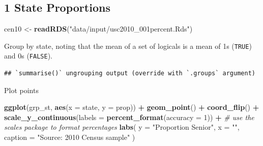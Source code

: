 \documentclass[]{book}
\newenvironment{Shaded}{\begin{snugshade}}{\end{snugshade}}
\newcommand{\CommentTok}[1]{\textcolor[rgb]{0.56,0.35,0.01}{\textit{#1}}}
\newcommand{\DataTypeTok}[1]{\textcolor[rgb]{0.13,0.29,0.53}{#1}}
\newcommand{\DecValTok}[1]{\textcolor[rgb]{0.00,0.00,0.81}{#1}}
\newcommand{\KeywordTok}[1]{\textcolor[rgb]{0.13,0.29,0.53}{\textbf{#1}}}
\newcommand{\NormalTok}[1]{#1}
\newcommand{\OperatorTok}[1]{\textcolor[rgb]{0.81,0.36,0.00}{\textbf{#1}}}
\newcommand{\StringTok}[1]{\textcolor[rgb]{0.31,0.60,0.02}{#1}}
\theoremstyle{definition}
\theoremstyle{definition}
\theoremstyle{definition}
\theoremstyle{remark}
\begin{document}
\begin{Shaded}
\begin{Highlighting}[]
\begin{Shaded}
\begin{Highlighting}[]
\begin{Shaded}
\begin{Highlighting}[]
{\subsection*{1 State Proportions}\label{state-proportions}}

\begin{Shaded}
\begin{Highlighting}[]
\NormalTok{cen10 <-}\StringTok{ }\KeywordTok{readRDS}\NormalTok{(}\StringTok{"data/input/usc2010_001percent.Rds"}\NormalTok{)}
\end{Highlighting}
\end{Shaded}

Group by state, noting that the mean of a set of logicals is a mean of 1s (\texttt{TRUE}) and 0s (\texttt{FALSE}).

\begin{Shaded}
\end{Shaded}

\begin{verbatim}
## `summarise()` ungrouping output (override with `.groups` argument)
\end{verbatim}

Plot points

\begin{Shaded}
\begin{Highlighting}[]
\KeywordTok{ggplot}\NormalTok{(grp_st, }\KeywordTok{aes}\NormalTok{(}\DataTypeTok{x =}\NormalTok{ state, }\DataTypeTok{y =}\NormalTok{ prop)) }\OperatorTok{+}
\StringTok{  }\KeywordTok{geom_point}\NormalTok{() }\OperatorTok{+}
\StringTok{  }\KeywordTok{coord_flip}\NormalTok{() }\OperatorTok{+}
\StringTok{  }\KeywordTok{scale_y_continuous}\NormalTok{(}\DataTypeTok{labels =} \KeywordTok{percent_format}\NormalTok{(}\DataTypeTok{accuracy =} \DecValTok{1}\NormalTok{)) }\OperatorTok{+}\StringTok{ }\CommentTok{# use the scales package to format percentages}
\StringTok{  }\KeywordTok{labs}\NormalTok{(}
    \DataTypeTok{y =} \StringTok{"Proportion Senior"}\NormalTok{,}
    \DataTypeTok{x =} \StringTok{""}\NormalTok{,}
    \DataTypeTok{caption =} \StringTok{"Source: 2010 Census sample"}
\NormalTok{  )}
\end{Highlighting}
\end{Shaded}


\end{Highlighting}
\end{Shaded}
\end{Highlighting}
\end{Shaded}
\end{Highlighting}
\end{Shaded}
\end{document}
